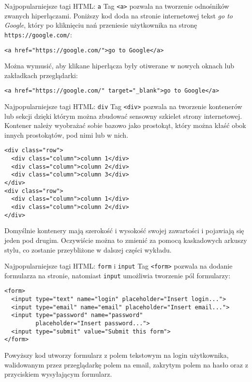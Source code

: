 \begin{frame}[fragile]{Najpopularniejsze tagi HTML: \texttt{a}}
	Tag \texttt{<a>} pozwala na tworzenie odnośników zwanych hiperłączami. Poniższy kod doda na stronie internetowej tekst \emph{go to Google}, który po kliknięciu nań przeniesie użytkownika na stronę \texttt{https://google.com/}:

	\begin{lstlisting}
<a href="https://google.com/">go to Google</a>
	\end{lstlisting}
	
	Można wymusić, aby klikane hiperłącza były otiwerane w nowych oknach lub zakładkach przeglądarki:

	\begin{lstlisting}
<a href="https://google.com/" target="_blank">go to Google</a>
	\end{lstlisting}
\end{frame}

\begin{frame}[fragile]{Najpopularniejsze tagi HTML: \texttt{div}}
	Tag \texttt{<div>} pozwala na tworzenie kontenerów lub sekcji dzięki którym można zbudować sensowny szkielet strony internetowej. Kontener należy wyobrażać sobie bazowo jako prostokąt, który można kłaść obok innych prostokątów, pod nimi lub w nich.

	\begin{lstlisting}
<div class="row">
  <div class="column">column 1</div>
  <div class="column">column 2</div>
  <div class="column">column 3</div>
</div>
<div class="row">
  <div class="column">column 1</div>
  <div class="column">column 2</div>
</div>
	\end{lstlisting}
	
	Domyślnie kontenery mają szerokość i wysokość swojej zawartości i pojawiają się jeden pod drugim. Oczywiście można to zmienić za pomocą kaskadowych arkuszy stylu, co zostanie przeybliżone w dalszej części wykładu.
\end{frame}

\begin{frame}[fragile]{Najpopularniejsze tagi HTML: \texttt{form} i \texttt{input}}
	Tag \texttt{<form>} pozwala na dodanie formularza na stronie, natomiast \texttt{input} umożliwia tworzenie pól formularzy:

	\begin{lstlisting}
<form>
  <input type="text" name="login" placeholder="Insert login...">
  <input type="email" name="email" placeholder="Insert email...">
  <input type="password" name="password"
         placeholder="Insert password...">
  <input type="submit" value="Submit this form">
</form>
	\end{lstlisting}
	
	Powyższy kod utworzy formularz z polem tekstowym na login użytkownika, walidowanym przez przeglądarkę polem na email, zakrytym polem na hasło oraz z przyciskiem wysyłającym formularz. 
\end{frame}

